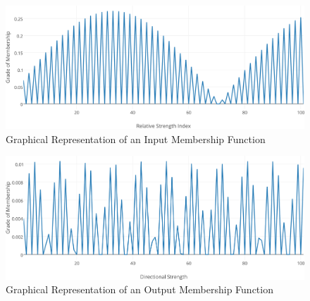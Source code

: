 \documentclass[12pt,journal,compsoc]{IEEEtran}
\begin{document}
\begin{figure}[h!]
\begin{center}
\includegraphics[width=1.00\columnwidth]{figures/mf-input/mf-input}
\caption{{\label{input-mf}Graphical Representation of an Input Membership Function%
}}
\end{center}
\end{figure}

\begin{figure}[h!]
\begin{center}
\includegraphics[width=1.00\columnwidth]{figures/mf-output/mf-output}
\caption{{\label{output-mf}Graphical Representation of an Output Membership Function%
}}
\end{center}
\end{figure}
\end{document}

